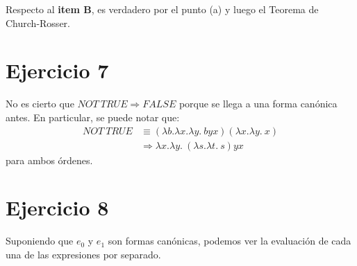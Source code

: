 \documentclass{article}
\begin{document}
Respecto al \textbf{item B}, es verdadero por el punto (a) y luego el Teorema de Church-Rosser.

\section*{Ejercicio 7}
No es cierto que $NOT\ TRUE \Rightarrow FALSE$ porque se llega a una forma canónica antes.
En particular, se puede notar que:
\begin{equation*}
  \begin{aligned}
    NOT\ TRUE &\equiv (\lambda b.\lambda x.\lambda y.\ byx)(\lambda x.\lambda y.\ x) \\ 
              &\Rightarrow \lambda x.\lambda y.\ (\lambda s.\lambda t.\ s)yx
  \end{aligned}
\end{equation*}
para ambos órdenes.

\section*{Ejercicio 8}
Suponiendo que $e_0$ y $e_1$ son formas canónicas, podemos ver la evaluación de cada una de las expresiones por separado.
\end{document}

